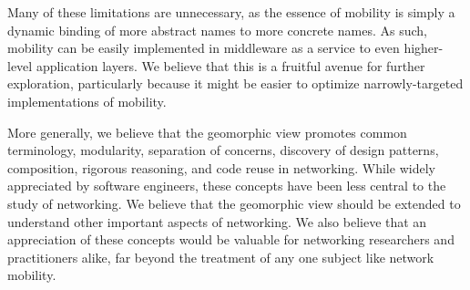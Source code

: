 Many of these limitations are unnecessary, as
the essence of mobility is simply a dynamic binding of more abstract
names to more concrete names.  
As such, mobility can be easily implemented in middleware as a service to
even higher-level application layers.  
We believe that this is a fruitful avenue for further exploration,
particularly because it might be easier to optimize narrowly-targeted
implementations of mobility.

More generally, we believe that the geomorphic view promotes
common terminology, modularity,
separation of concerns, discovery of design patterns,
composition,
rigorous reasoning,
and code reuse in networking.
While widely appreciated by software engineers, 
these concepts have been less central to the study of networking.  
We believe that the geomorphic view should be extended to understand
other important aspects of networking.
We also believe that an appreciation of these concepts would be 
valuable for networking researchers and practitioners alike, 
far beyond the treatment of any one subject like network mobility.

